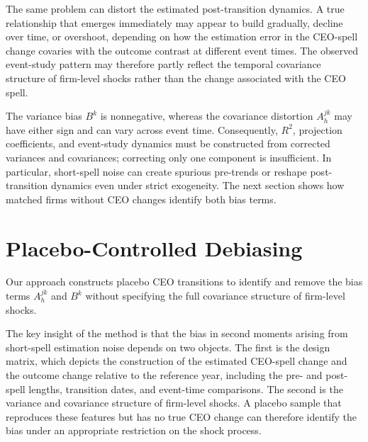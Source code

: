 \documentclass[sigconf,nonacm]{acmart}
\begin{document}
The same problem can distort the estimated post-transition dynamics.
A true relationship that emerges immediately may appear to build
gradually, decline over time, or overshoot, depending on how the
estimation error in the CEO-spell change covaries with the outcome
contrast at different event times. The observed event-study pattern
may therefore partly reflect the temporal covariance structure of
firm-level shocks rather than the change associated with
the CEO spell.

The variance bias $B^k$ is nonnegative, whereas the covariance distortion $A_h^{jk}$ may have either sign and can vary across event time. Consequently, $R^2$, projection coefficients, and event-study dynamics must be constructed from corrected variances and covariances; correcting only one component is insufficient. In particular, short-spell noise can create spurious pre-trends or reshape post-transition dynamics even under strict exogeneity. The next section shows how matched firms without CEO changes identify both bias terms.


\section{Placebo-Controlled Debiasing}\label{sec:placebo_debiasing}

Our approach constructs placebo CEO transitions to identify and remove
the bias terms $A_h^{jk}$ and $B^k$ without specifying the full
covariance structure of firm-level shocks. 

The key insight of the method is that the bias in second moments arising from short-spell estimation noise depends on two objects. The first is the design matrix, which depicts the construction of the estimated CEO-spell change and the outcome change relative to the reference year, including the pre- and post-spell lengths, transition dates, and event-time comparisons. The second is the variance and covariance structure of firm-level shocks. A placebo sample that reproduces these features but has no true CEO change can therefore identify the bias under an appropriate restriction on the shock process.
\end{document}
